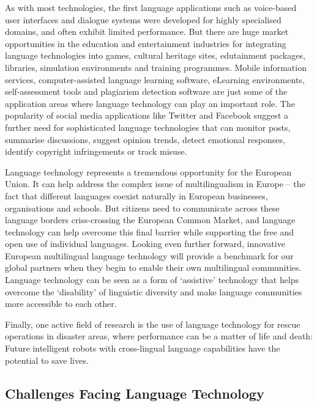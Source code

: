 \begin{multicols}{2}
    As with most technologies, the first language applications such as voice-based user interfaces and dialogue systems were developed for highly specialised domains, and often exhibit limited performance. But there are huge market opportunities in the education and entertainment industries for integrating language technologies into games, cultural heritage sites, edutainment packages, libraries, simulation environments and training programmes. Mobile information services, computer-assisted language learning software, eLearning environments, self-assessment tools and plagiarism detection software are just some of the application areas where language technology can play an important role. The popularity of social media applications like Twitter and Facebook suggest a further need for sophisticated language technologies that can monitor posts, summarise discussions, suggest opinion trends, detect emotional responses, identify copyright infringements or track misuse.


    Language technology represents a tremendous opportunity for the European Union. It can help address the complex issue of multilingualism in Europe – the fact that different languages coexist naturally in European businesses, organisations and schools. But citizens need to communicate across these language borders criss-crossing the European Common Market, and language technology can help overcome this final barrier while supporting the free and open use of individual languages. Looking even further forward, innovative European multilingual language technology will provide a benchmark for our global partners when they begin to enable their own multilingual communities. Language technology can be seen as a form of ‘assistive’ technology that helps overcome the ‘disability’ of linguistic diversity and make language communities more accessible to each other.

    Finally, one active field of research is the use of language technology for rescue operations in disaster areas, where performance can be a matter of life and death: Future intelligent robots with cross-lingual language capabilities have the potential to save lives.

\subsection{Challenges Facing Language Technology}


\end{multicols}
